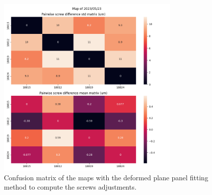 \begin{figure}
    \centering
    \includegraphics[width=0.8\textwidth]{images/20230523_mat_panelfit_deform.png}
    \caption{Confusion matrix of the maps with the deformed plane panel fitting method to compute the screws adjustments.}
    \label{fig:conf_matrix_deform}
\end{figure}
